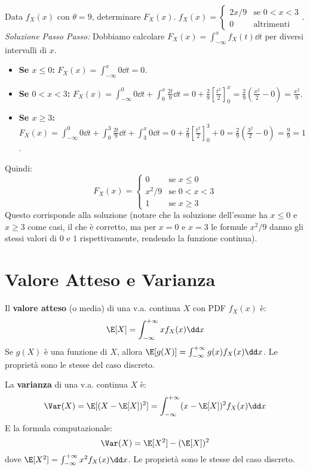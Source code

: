 \begin{example}
Data $f_X(x)$ con $\theta=9$, determinare $F_X(x)$.
$f_X(x) = \begin{cases} 2x/9 & \text{se } 0 < x < 3 \\ 0 & \text{altrimenti} \end{cases}$.
\textit{Soluzione Passo Passo:}
Dobbiamo calcolare $F_X(x) = \int_{-\infty}^x f_X(t) \dd t$ per diversi intervalli di $x$.
\begin{itemize}
    \item \textbf{Se $x \le 0$:}
    $F_X(x) = \int_{-\infty}^x 0 \dd t = 0$.
    \item \textbf{Se $0 < x < 3$:}
    $F_X(x) = \int_{-\infty}^0 0 \dd t + \int_0^x \frac{2t}{9} \dd t = 0 + \frac{2}{9} \left[ \frac{t^2}{2} \right]_0^x = \frac{2}{9} \left( \frac{x^2}{2} - 0 \right) = \frac{x^2}{9}$.
    \item \textbf{Se $x \ge 3$:}
    $F_X(x) = \int_{-\infty}^0 0 \dd t + \int_0^3 \frac{2t}{9} \dd t + \int_3^x 0 \dd t = 0 + \frac{2}{9} \left[ \frac{t^2}{2} \right]_0^3 + 0 = \frac{2}{9} \left( \frac{3^2}{2} - 0 \right) = \frac{9}{9} = 1$.
\end{itemize}
Quindi:
\[ F_X(x) = \begin{cases} 0 & \text{se } x \le 0 \\ x^2/9 & \text{se } 0 < x < 3 \\ 1 & \text{se } x \ge 3 \end{cases} \]
Questo corrisponde alla soluzione (notare che la soluzione dell'esame ha $x \le 0$ e $x \ge 3$ come casi, il che è corretto, ma per $x=0$ e $x=3$ le formule $x^2/9$ danno gli stessi valori di $0$ e $1$ rispettivamente, rendendo la funzione continua).
\end{example}

\section{Valore Atteso e Varianza}
\begin{definition}
Il \textbf{valore atteso} (o media) di una v.a. continua $X$ con PDF $f_X(x)$ è:
\[ \E[X] = \int_{-\infty}^{+\infty} x f_X(x) \dd x \]
Se $g(X)$ è una funzione di $X$, allora $\E[g(X)] = \int_{-\infty}^{+\infty} g(x) f_X(x) \dd x$.
Le proprietà sono le stesse del caso discreto.
\end{definition}

\begin{definition}[Varianza]
La \textbf{varianza} di una v.a. continua $X$ è:
\[ \Var(X) = \E[(X - \E[X])^2] = \int_{-\infty}^{+\infty} (x - \E[X])^2 f_X(x) \dd x \]
E la formula computazionale:
\[ \Var(X) = \E[X^2] - (\E[X])^2 \]
dove $\E[X^2] = \int_{-\infty}^{+\infty} x^2 f_X(x) \dd x$.
Le proprietà sono le stesse del caso discreto.
\end{definition}

